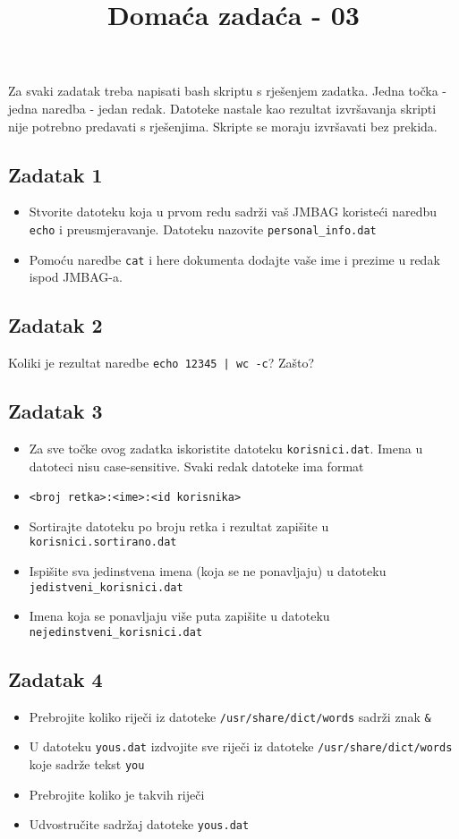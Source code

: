 \documentclass[12pt,a4paper]{article}
\newcommand{\shell}[1]{\texttt{#1}}
\begin{document}
  \title{Domaća zadaća - 03\vspace{-2em}}
  \maketitle
  Za svaki zadatak treba napisati bash skriptu s rješenjem zadatka. Jedna točka - jedna naredba - jedan redak. Datoteke nastale kao rezultat izvršavanja skripti nije potrebno predavati s rješenjima. Skripte se moraju izvršavati bez prekida.
  \subsection*{Zadatak 1}
  \begin{itemize}
    \item Stvorite datoteku koja u prvom redu sadrži vaš JMBAG koristeći naredbu \texttt{echo} i preusmjeravanje. Datoteku nazovite \texttt{personal\_info.dat}
    \item Pomoću naredbe \texttt{cat} i here dokumenta dodajte vaše ime i prezime u redak ispod JMBAG-a.
  \end{itemize}
  \subsection*{Zadatak 2}
  Koliki je rezultat naredbe \shell{echo 12345 | wc -c}? Zašto?
  \subsection*{Zadatak 3}
  \begin{itemize}
    \item[] Za sve točke ovog zadatka iskoristite datoteku \texttt{korisnici.dat}. Imena u datoteci nisu case-sensitive. Svaki redak datoteke ima format
    \item[] \texttt{<broj retka>:<ime>:<id korisnika>}
    \item Sortirajte datoteku po broju retka i rezultat zapišite u \texttt{korisnici.sortirano.dat}
    \item Ispišite sva jedinstvena imena (koja se ne ponavljaju) u datoteku\\\texttt{jedistveni\_korisnici.dat}
    \item Imena koja se ponavljaju više puta zapišite u datoteku\\\texttt{nejedinstveni\_korisnici.dat}
  \end{itemize}
  \subsection*{Zadatak 4}
  \begin{itemize}
  	\item Prebrojite koliko riječi iz datoteke \texttt{/usr/share/dict/words} sadrži znak \texttt{\&}
  	\item U datoteku \texttt{yous.dat} izdvojite sve riječi iz datoteke \texttt{/usr/share/dict/words} koje sadrže tekst \texttt{you}
  	\item Prebrojite koliko je takvih riječi
  	\item Udvostručite sadržaj datoteke \texttt{yous.dat}
  \end{itemize}
\end{document}

